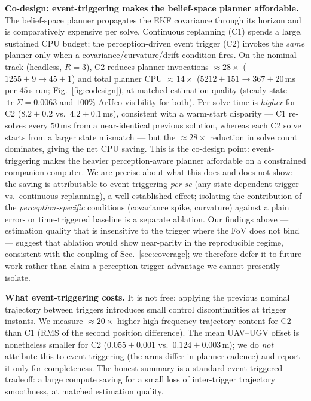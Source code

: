 \documentclass[letterpaper, 10 pt, conference]{ieeeconf}  %
\DeclareMathOperator{\tr}{tr}
\newcommand{\RESsolvesCone}{\ensuremath{1255\pm9}}\newcommand{\RESsolvesCthree}{\ensuremath{45\pm1}}
\newcommand{\RESmsCone}{\ensuremath{4.2\pm0.1}}\newcommand{\RESmsCthree}{\ensuremath{8.2\pm0.2}}
\newcommand{\REScpuCone}{\ensuremath{5212\pm151}}\newcommand{\REScpuCthree}{\ensuremath{367\pm20}}
\newcommand{\RESoffCone}{\ensuremath{0.124\pm0.003}}\newcommand{\RESoffCthree}{\ensuremath{0.055\pm0.001}}
\newcommand{\REScov}{\ensuremath{0.0063}}\newcommand{\RESsolveRed}{28}\newcommand{\REScpuRed}{14}
\begin{document}
\textbf{Co-design: event-triggering makes the belief-space planner affordable.} The belief-space
planner propagates the EKF covariance through its horizon and is comparatively expensive per
solve. Continuous replanning (C1) spends a large, sustained CPU budget; the perception-driven
event trigger (C2) invokes the \emph{same} planner only when a covariance/curvature/drift
condition fires. On the nominal track (headless, $R{=}3$), C2 reduces planner invocations
$\approx\!\RESsolveRed\times$ ($\RESsolvesCone\!\to\!\RESsolvesCthree$) and total planner CPU
$\approx\!\REScpuRed\times$ ($\REScpuCone\!\to\!\REScpuCthree$\,ms per $45$\,s run;
Fig.~\ref{fig:codesign}), at matched estimation quality (steady-state $\tr\Sigma=\REScov$ and
$100\%$ ArUco visibility for both). Per-solve time is \emph{higher} for C2
($\RESmsCthree$ vs.\ $\RESmsCone$\,ms), consistent with a warm-start disparity --- C1 re-solves
every $50$\,ms from a near-identical previous solution, whereas each C2 solve starts from a
larger state mismatch --- but the $\approx\!\RESsolveRed\times$ reduction in solve count
dominates, giving the net CPU saving. This is the co-design point: event-triggering makes the
heavier perception-aware planner affordable on a constrained companion computer. We are precise
about what this does and does not show: the saving is attributable to event-triggering
\emph{per se} (any state-dependent trigger vs.\ continuous replanning), a well-established
effect; isolating the contribution of the \emph{perception-specific} conditions (covariance
spike, curvature) against a plain error- or time-triggered baseline is a separate ablation. Our
findings above --- estimation quality that is insensitive to the trigger where the FoV does not
bind --- suggest that ablation would show near-parity in the reproducible regime, consistent
with the coupling of Sec.~\ref{sec:coverage}; we therefore defer it to future work rather than
claim a perception-trigger advantage we cannot presently isolate.

\textbf{What event-triggering costs.} It is not free: applying the previous nominal trajectory
between triggers introduces small control discontinuities at trigger instants. We measure
$\approx\!20\times$ higher high-frequency trajectory content for C2 than C1 (RMS of the second
position difference). The mean UAV--UGV offset is nonetheless smaller for C2
($\RESoffCthree$ vs.\ $\RESoffCone$\,m); we do \emph{not} attribute this to event-triggering
(the arms differ in planner cadence) and report it only for completeness. The honest summary is
a standard event-triggered tradeoff: a large compute saving for a small loss of inter-trigger
trajectory smoothness, at matched estimation quality.
\end{document}
